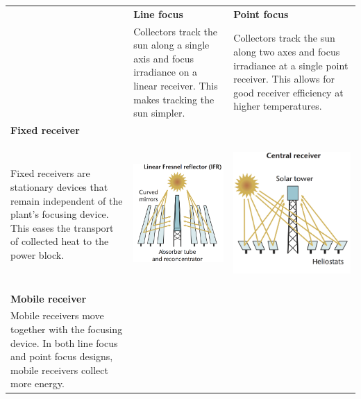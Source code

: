 \begin{table}[h!] %
  \centering
  \begin{tabular}{  m{5cm}  m{5cm}  m{5cm}  }
    \hline
    & \textbf{Line focus} & \textbf{Point focus} \\ 
    & Collectors track the sun along a single axis and focus irradiance on a linear receiver. This makes tracking the sun simpler. & Collectors track the sun along two axes and focus irradiance at a single point receiver. This allows for good receiver efficiency at higher temperatures.\\ \hline \hline
    \textbf{Fixed receiver} & &\\

    Fixed receivers are stationary devices that remain independent of the plant's focusing device. This eases the transport of collected heat to the power block.
    &
    \begin{minipage}[t]{5cm}
      \centering
	 \includegraphics[height=55mm]{FIG/SUM/LF}
    \end{minipage}
    & 
    \begin{minipage}[t]{5cm}
      \centering
	  \includegraphics[height=55mm]{FIG/SUM/ST}
    \end{minipage}
    \\ \hline
    \textbf{Mobile receiver} & & \\
    Mobile receivers move together with the focusing device. In both line focus and point focus designs, mobile receivers collect more energy.

\end{tabular}
\end{table}
